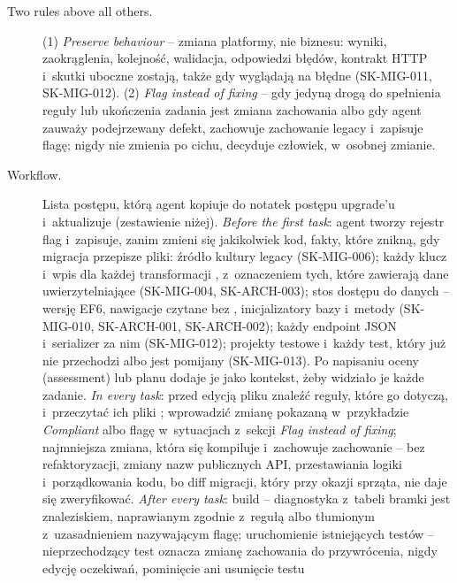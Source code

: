 \begin{description}
  \item[Two rules above all others.] (1) \emph{Preserve behaviour} -- zmiana platformy, nie
        biznesu: wyniki, zaokrąglenia, kolejność, walidacja, odpowiedzi błędów, kontrakt HTTP
        i~skutki uboczne zostają, także gdy wyglądają na błędne (SK-MIG-011, SK-MIG-012).
        (2) \emph{Flag instead of fixing} -- gdy jedyną drogą do spełnienia reguły lub
        ukończenia zadania jest zmiana zachowania albo gdy agent zauważy podejrzewany defekt,
        zachowuje zachowanie legacy i~zapisuje flagę; nigdy nie zmienia po cichu, decyduje
        człowiek, w~osobnej zmianie.
  \item[Workflow.] Lista postępu, którą agent kopiuje do notatek postępu upgrade'u i~aktualizuje
        (zestawienie niżej). \emph{Before the first task}: agent tworzy rejestr flag
        i~zapisuje, zanim zmieni się jakikolwiek kod, fakty, które znikną, gdy migracja
        przepisze pliki: źródło kultury legacy (SK-MIG-006); każdy klucz
         i~wpis  dla każdej transformacji
        , z~oznaczeniem tych, które zawierają dane uwierzytelniające
        (SK-MIG-004, SK-ARCH-003); stos dostępu do danych -- wersję EF6, nawigacje czytane bez
        , inicjalizatory bazy i~metody  (SK-MIG-010,
        SK-ARCH-001, SK-ARCH-002); każdy endpoint JSON i~serializer za nim (SK-MIG-012);
        projekty testowe i~każdy test, który już nie przechodzi albo jest pomijany
        (SK-MIG-013). Po napisaniu oceny (assessment) lub planu dodaje je jako kontekst, żeby
        widziało je każde zadanie. \emph{In every task}: przed edycją pliku znaleźć reguły,
        które go dotyczą, i~przeczytać ich pliki ; wprowadzić
        zmianę pokazaną w~przykładzie \emph{Compliant} albo flagę w~sytuacjach z~sekcji
        \emph{Flag instead of fixing}; najmniejsza zmiana, która się kompiluje i~zachowuje
        zachowanie -- bez refaktoryzacji, zmiany nazw publicznych API, przestawiania logiki
        i~porządkowania kodu, bo diff migracji, który przy okazji sprząta, nie daje się
        zweryfikować. \emph{After every task}: build -- diagnostyka z~tabeli bramki jest
        znaleziskiem, naprawianym zgodnie z~regułą albo tłumionym z~uzasadnieniem nazywającym
        flagę; uruchomienie istniejących testów -- nieprzechodzący test oznacza zmianę
        zachowania do przywrócenia, nigdy edycję oczekiwań, pominięcie ani usunięcie testu

\end{description}
